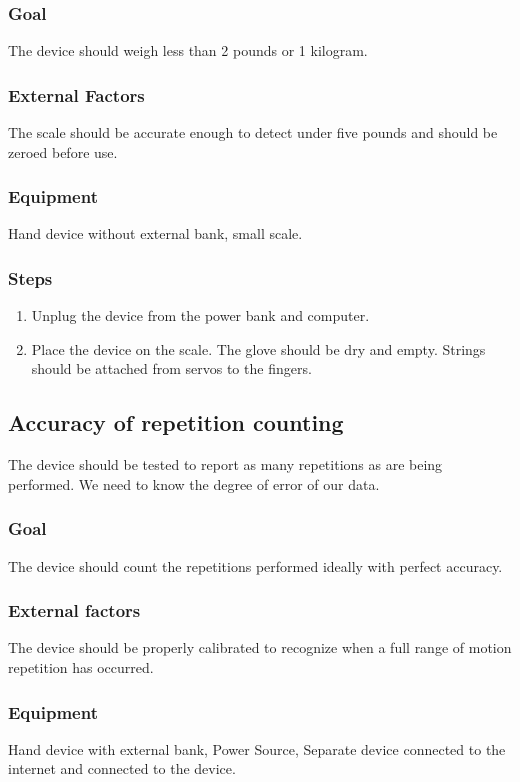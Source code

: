 \documentclass{article}
\begin{document}
\subsubsection{Goal} The device should weigh less than 2 pounds or 1 kilogram.

\subsubsection{External Factors} The scale should be accurate enough to detect under five pounds and should be zeroed before use.

\subsubsection{Equipment} Hand device without external bank, small scale.

\subsubsection{Steps}
\begin{enumerate}
\item Unplug the device from the power bank and computer.
\item Place the device on the scale. The glove should be dry and empty. Strings should be attached from servos to the fingers.
\end{enumerate}

\subsection{Accuracy of repetition counting}
The device should be tested to report as many repetitions as are being performed. We need to know the degree of error of our data.

\subsubsection{Goal} The device should count the repetitions performed ideally with perfect accuracy.

\subsubsection{External factors} The device should be properly calibrated to recognize when a full range of motion repetition has occurred.

\subsubsection{Equipment} Hand device with external bank, Power Source, Separate device connected to the internet and connected to the device.
\end{document}

